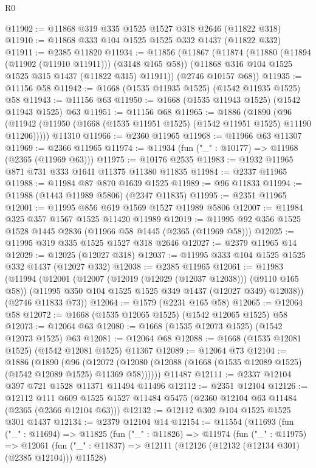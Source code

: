 \begin{lexlean}{R0}
\begin{coremodule}
@11902 := @11868 @319 @335 @1525 @1527 @318 @2646 (@11822 @318)
@11910 := @11868 @333 @104 @1525 @1525 @332 @1437 (@11822 @332)
@11911 := @2385 @11820
@11934 := @11856
    (@11867
      (@11874
        (@11880 (@11894 (@11902 (@11910 @11911))) (@3148 @165 @58))
        (@11868 @316 @104 @1525 @1525 @315 @1437 (@11822 @315) @11911))
      (@2746 @10157 @68))
@11935 := @11156 @58
@11942 := @1668 (@1535 @11935 @1525) (@1542 @11935 @1525) @58
@11943 := @11156 @63
@11950 := @1668 (@1535 @11943 @1525) (@1542 @11943 @1525) @63
@11951 := @11156 @68
@11965 := @1886
    (@1890 (@96 (@11942 (@11950 (@1668 (@1535 @11951 @1525) (@1542 @11951 @1525) @11190 @11206)))))
    @11310
@11966 := @2360 @11965
@11968 := @11966 @63 @11307
@11969 := @2366 @11965
@11974 := @11934 (fun ("_" : @10177) => @11968 (@2365 (@11969 @63)))
@11975 := @10176 @2535
@11983 := @1932 @11965 @871 @731 @333 @1641 @11375 @11380 @11835
@11984 := @2337 @11965
@11988 := @11984 @87 @870 @1639 @1525
@11989 := @96 @11833
@11994 := @11988 (@1443 @11989 @5806) (@2347 @11835)
@11995 := @2351 @11965
@12001 := @11995 @856 @619 @1569 @1527 @11989 @5806
@12007 := @11984 @325 @357 @1567 @1525 @11420 @11989
@12019 := @11995 @92 @356 @1525 @1528 @1445 @2836 (@11966 @58 @1445 (@2365 (@11969 @58)))
@12025 := @11995 @319 @335 @1525 @1527 @318 @2646
@12027 := @2379 @11965 @14
@12029 := @12025 (@12027 @318)
@12037 := @11995 @333 @104 @1525 @1525 @332 @1437 (@12027 @332)
@12038 := @2385 @11965
@12061 := @11983
    (@11994
      (@12001
        (@12007 (@12019 (@12029 (@12037 @12038))) (@9110 @165 @58))
        (@11995 @350 @104 @1525 @1525 @349 @1437 (@12027 @349) @12038))
      (@2746 @11833 @73))
@12064 := @1579 (@2231 @165 @58)
@12065 := @12064 @58
@12072 := @1668 (@1535 @12065 @1525) (@1542 @12065 @1525) @58
@12073 := @12064 @63
@12080 := @1668 (@1535 @12073 @1525) (@1542 @12073 @1525) @63
@12081 := @12064 @68
@12088 := @1668 (@1535 @12081 @1525) (@1542 @12081 @1525) @11367
@12089 := @12064 @73
@12104 := @1886
    (@1890
      (@96 (@12072 (@12080 (@12088 (@1668 (@1535 @12089 @1525) (@1542 @12089 @1525) @11369 @58))))))
    @11487
@12111 := @2337 @12104 @397 @721 @1528 @11371 @11494 @11496
@12112 := @2351 @12104
@12126 := @12112
    @111
    @609
    @1525
    @1527
    @11484
    @5475
    (@2360 @12104 @63 @11484 (@2365 (@2366 @12104 @63)))
@12132 := @12112 @302 @104 @1525 @1525 @301 @1437
@12134 := @2379 @12104 @14
@12154 := @11554
    (@11693
      (fun ("_" : @11694) =>
      @11825
        (fun ("_" : @11826) =>
        @11974
          (fun ("_" : @11975) =>
          @12061
            (fun ("_" : @11837) => @12111 (@12126 (@12132 (@12134 @301) (@2385 @12104))) @11528)

\end{coremodule}
\end{lexlean}
